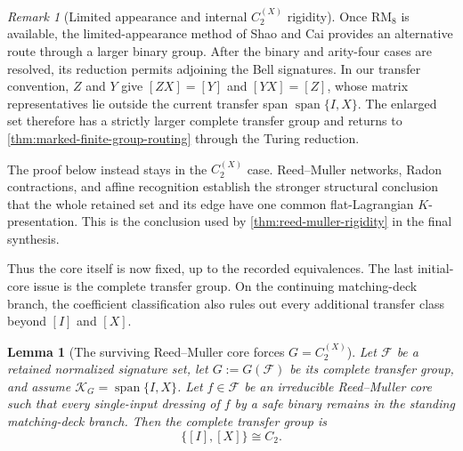 \documentclass[11pt,letterpaper,onecolumn]{article}
\theoremstyle{plain}
\newtheorem{lemma}[lemma]{Lemma}
\theoremstyle{definition}
\theoremstyle{remark}
\newtheorem{remark}[remark]{Remark}
\newcommand{\cF}{\mathcal F}
\newcommand{\CycX}[1]{{C_{#1}^{(X)}}}
\newcommand{\Span}{\operatorname{span}}
\newcommand{\RMcore}{\mathrm{RM}_8}
\begin{document}
\begin{remark}[Limited appearance and internal \(\CycX{2}\) rigidity]
\label{rem:rm-binary-enlargement-shortcut}
Once \(\RMcore\) is available, the limited-appearance method of Shao and
Cai \cite[full version, Section~8.2, Lemmas~8.9--8.10]{ShaoCai2020}
provides an alternative route through a larger binary group. After the
binary and arity-four cases are resolved, its reduction permits adjoining
the Bell signatures. In our transfer convention, \(Z\) and \(Y\) give
\([ZX]=[Y]\) and \([YX]=[Z]\), whose matrix representatives lie outside the current transfer span
\(\Span\{I,X\}\). The enlarged set therefore has a strictly larger
complete transfer group and returns to
\cref{thm:marked-finite-group-routing} through the Turing reduction.

The proof below instead stays in the \(\CycX{2}\) case. Reed--Muller networks,
Radon contractions, and affine recognition establish the stronger
structural conclusion that the whole retained set and its edge have one
common flat-Lagrangian \(K\)-presentation. This is the conclusion used by
\cref{thm:reed-muller-rigidity} in the final synthesis.
\end{remark}

Thus the core itself is now fixed, up to the recorded equivalences.  The last
initial-core issue is the complete transfer group.  On the continuing
matching-deck branch, the coefficient classification also rules out every additional transfer class
beyond \([I]\) and \([X]\).

\begin{lemma}[The surviving Reed--Muller core forces \(G=\CycX{2}\)]
\label{lem:rm-safe-group-collapse}
Let \(\cF\) be a retained normalized signature set, let
\(G:=G(\cF)\) be its complete transfer group, and assume
\(\mathscr K_G=\Span\{I,X\}\).  Let \(f\in\cF\) be an irreducible
Reed--Muller core such that every single-input dressing of \(f\) by a safe binary remains
in the standing matching-deck branch.  Then the complete transfer group is
\[
  \{[I],[X]\}\cong C_2.
\]
\end{lemma}
\end{document}
